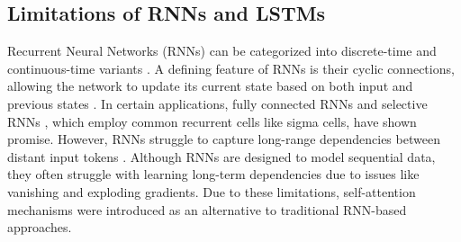 \subsection{Limitations of RNNs and LSTMs}  
Recurrent Neural Networks (RNNs) can be categorized into discrete-time and continuous-time variants \cite{grossberg2013}. A defining feature of RNNs is their cyclic connections, allowing the network to update its current state based on both input and previous states \cite{salehinejad2017recent}. In certain applications, fully connected RNNs \cite{elman1990} and selective RNNs \cite{ster2013}, which employ common recurrent cells like sigma cells, have shown promise. However, RNNs struggle to capture long-range dependencies between distant input tokens \cite{ster2013}. Although RNNs are designed to model sequential data, they often struggle with learning long-term dependencies due to issues like vanishing and exploding gradients. Due to these limitations, self-attention mechanisms were introduced as an alternative to traditional RNN-based approaches.

